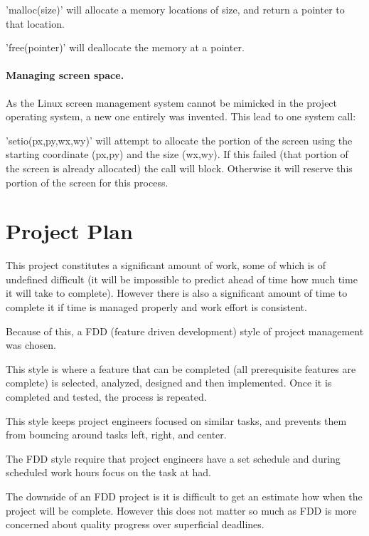 \documentclass[a4paper]{report}
\begin{document}
'malloc(size)' will allocate a memory locations of size, and return a pointer to that location.

'free(pointer)' will deallocate the memory at a pointer.

\subsubsection*{Managing screen space.}

As the Linux screen management system cannot be mimicked in the project operating system, a new one entirely was invented. This lead to one system call:

'setio(px,py,wx,wy)' will attempt to allocate the portion of the screen using the starting coordinate (px,py) and the size (wx,wy). If this failed (that portion of the screen is already allocated) the call will block. Otherwise it will reserve this portion of the screen for this process.

\chapter*{Project Plan}

This project constitutes a significant amount of work, some of which is of undefined difficult (it will be impossible to predict ahead of time how much time it will take to complete). However there is also a significant amount of time to complete it if time is managed properly and work effort is consistent.

Because of this, a FDD (feature driven development) style of project management was chosen.

This style is where a feature that can be completed (all prerequisite features are complete) is selected, analyzed, designed and then implemented. Once it is completed and tested, the process is repeated.

This style keeps project engineers focused on similar tasks, and prevents them from bouncing around tasks left, right, and center.

The FDD style require that project engineers have a set schedule and during scheduled work hours focus on the task at had.

The downside of an FDD project is it is difficult to get an estimate how when the project will be complete. However this does not matter so much as FDD is more concerned about quality progress over superficial deadlines.
\end{document}
